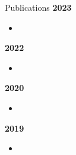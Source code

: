 \documentclass{resume} %
\begin{document}
\begin{rSection}{Publications}
{\bf\large 2023}

\begin{itemize}
 \item {}

  
   \end{itemize}


{\bf\large 2022}
\begin{itemize}
 \item {}
\end{itemize}

{\bf\large 2020}
\begin{itemize}
 \item {} %
\end{itemize}

{\bf\large 2019}
\begin{itemize}
\item {} %
\end{itemize}

\end{rSection}


	
\
\end{document}
